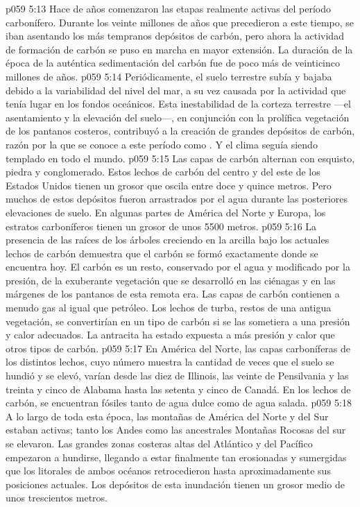\vs p059 5:13 \pc Hace  de años comenzaron las etapas realmente activas del período carbonífero. Durante los veinte millones de años que precedieron a este tiempo, se iban asentando los más tempranos depósitos de carbón, pero ahora la actividad de formación de carbón se puso en marcha en mayor extensión. La duración de la época de la auténtica sedimentación del carbón fue de poco más de veinticinco millones de años.
\vs p059 5:14 Periódicamente, el suelo terrestre subía y bajaba debido a la variabilidad del nivel del mar, a su vez causada por la actividad que tenía lugar en los fondos oceánicos. Esta inestabilidad de la corteza terrestre ---el asentamiento y la elevación del suelo---, en conjunción con la prolífica vegetación de los pantanos costeros, contribuyó a la creación de grandes depósitos de carbón, razón por la que se conoce a este período como . Y el clima seguía siendo templado en todo el mundo.
\vs p059 5:15 Las capas de carbón alternan con esquisto, piedra y conglomerado. Estos lechos de carbón del centro y del este de los Estados Unidos tienen un grosor que oscila entre doce y quince metros. Pero muchos de estos depósitos fueron arrastrados por el agua durante las posteriores elevaciones de suelo. En algunas partes de América del Norte y Europa, los estratos carboníferos tienen un grosor de unos 5500 metros.
\vs p059 5:16 La presencia de las raíces de los árboles creciendo en la arcilla bajo los actuales lechos de carbón demuestra que el carbón se formó exactamente donde se encuentra hoy. El carbón es un resto, conservado por el agua y modificado por la presión, de la exuberante vegetación que se desarrolló en las ciénagas y en las márgenes de los pantanos de esta remota era. Las capas de carbón contienen a menudo gas al igual que petróleo. Los lechos de turba, restos de una antigua vegetación, se convertirían en un tipo de carbón si se las sometiera a una presión y calor adecuados. La antracita ha estado expuesta a más presión y calor que otros tipos de carbón.
\vs p059 5:17 En América del Norte, las capas carboníferas de los distintos lechos, cuyo número muestra la cantidad de veces que el suelo se hundió y se elevó, varían desde las diez de Illinois, las veinte de Pensilvania y las treinta y cinco de Alabama hasta las setenta y cinco de Canadá. En los lechos de carbón, se encuentran fósiles tanto de agua dulce como de agua salada.
\vs p059 5:18 A lo largo de toda esta época, las montañas de América del Norte y del Sur estaban activas; tanto los Andes como las ancestrales Montañas Rocosas del sur se elevaron. Las grandes zonas costeras altas del Atlántico y del Pacífico empezaron a hundirse, llegando a estar finalmente tan erosionadas y sumergidas que los litorales de ambos océanos retrocedieron hasta aproximadamente sus posiciones actuales. Los depósitos de esta inundación tienen un grosor medio de unos trescientos metros.
